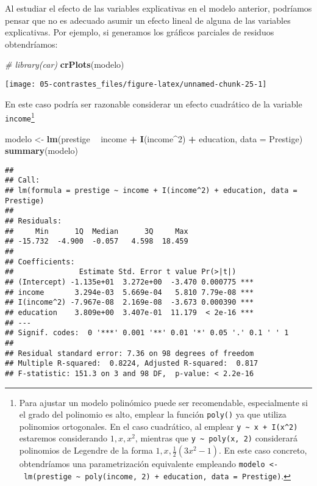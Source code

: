 \documentclass[]{book}
\newenvironment{Shaded}{\begin{snugshade}}{\end{snugshade}}
\newcommand{\KeywordTok}[1]{\textcolor[rgb]{0.13,0.29,0.53}{\textbf{#1}}}
\newcommand{\DataTypeTok}[1]{\textcolor[rgb]{0.13,0.29,0.53}{#1}}
\newcommand{\DecValTok}[1]{\textcolor[rgb]{0.00,0.00,0.81}{#1}}
\newcommand{\StringTok}[1]{\textcolor[rgb]{0.31,0.60,0.02}{#1}}
\newcommand{\CommentTok}[1]{\textcolor[rgb]{0.56,0.35,0.01}{\textit{#1}}}
\newcommand{\OperatorTok}[1]{\textcolor[rgb]{0.81,0.36,0.00}{\textbf{#1}}}
\newcommand{\NormalTok}[1]{#1}
\theoremstyle{break}
\theoremstyle{definition}
\theoremstyle{definition}
\theoremstyle{definition}
\theoremstyle{remark}
\begin{document}
Al estudiar el efecto de las variables explicativas en el modelo
anterior, podríamos pensar que no es adecuado asumir un efecto lineal de
alguna de las variables explicativas. Por ejemplo, si generamos los
gráficos parciales de residuos obtendríamos:

\begin{Shaded}
\begin{Highlighting}[]
\CommentTok{# library(car)}
\KeywordTok{crPlots}\NormalTok{(modelo)}
\end{Highlighting}
\end{Shaded}

\begin{center}\texttt{[image: 05-contrastes\_files/figure-latex/unnamed-chunk-25-1]} \end{center}

En este caso podría ser razonable considerar un efecto cuadrático de la
variable \texttt{income}\footnote{Para ajustar un modelo polinómico
  puede ser recomendable, especialmente si el grado del polinomio es
  alto, emplear la función \texttt{poly()} ya que utiliza polinomios
  ortogonales. En el caso cuadrático, al emplear
  \texttt{y\ \textasciitilde{}\ x\ +\ I(x\^{}2)} estaremos considerando
  \(1, x, x^2\), mientras que \texttt{y\ \textasciitilde{}\ poly(x,\ 2)}
  considerará polinomios de Legendre de la forma
  \(1, x, \frac{1}{2}(3x^2-1)\). En este caso concreto, obtendríamos una
  parametrización equivalente empleando
  \texttt{modelo\ \textless{}-\ lm(prestige\ \textasciitilde{}\ poly(income,\ 2)\ +\ education,\ data\ =\ Prestige)}.}

\begin{Shaded}
\begin{Highlighting}[]
\NormalTok{modelo <-}\StringTok{ }\KeywordTok{lm}\NormalTok{(prestige }\OperatorTok{~}\StringTok{ }\NormalTok{income }\OperatorTok{+}\StringTok{ }\KeywordTok{I}\NormalTok{(income}\OperatorTok{^}\DecValTok{2}\NormalTok{) }\OperatorTok{+}\StringTok{ }\NormalTok{education, }\DataTypeTok{data =}\NormalTok{ Prestige)}
\KeywordTok{summary}\NormalTok{(modelo)}
\end{Highlighting}
\end{Shaded}

\begin{verbatim}
## 
## Call:
## lm(formula = prestige ~ income + I(income^2) + education, data = Prestige)
## 
## Residuals:
##     Min      1Q  Median      3Q     Max 
## -15.732  -4.900  -0.057   4.598  18.459 
## 
## Coefficients:
##               Estimate Std. Error t value Pr(>|t|)    
## (Intercept) -1.135e+01  3.272e+00  -3.470 0.000775 ***
## income       3.294e-03  5.669e-04   5.810 7.79e-08 ***
## I(income^2) -7.967e-08  2.169e-08  -3.673 0.000390 ***
## education    3.809e+00  3.407e-01  11.179  < 2e-16 ***
## ---
## Signif. codes:  0 '***' 0.001 '**' 0.01 '*' 0.05 '.' 0.1 ' ' 1
## 
## Residual standard error: 7.36 on 98 degrees of freedom
## Multiple R-squared:  0.8224, Adjusted R-squared:  0.817 
## F-statistic: 151.3 on 3 and 98 DF,  p-value: < 2.2e-16
\end{verbatim}
\end{document}
